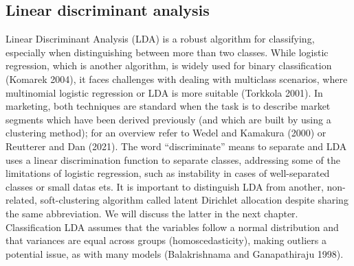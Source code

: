 \begin{Shaded}
\begin{Highlighting}[]
\OtherTok{\textless{}{-}} \SpecialCharTok{==} \NormalTok{) }\SpecialCharTok{\%\textgreater{}\%} \NormalTok{(}\SpecialCharTok{{-}}
\OtherTok{\textless{}{-}} \SpecialCharTok{==} \NormalTok{) }\SpecialCharTok{\%\textgreater{}\%} \NormalTok{(}\SpecialCharTok{{-}}

\end{Highlighting}
\end{Shaded}

\subsection{Linear discriminant
analysis}\label{linear-discriminant-analysis}

Linear Discriminant Analysis (LDA) is a robust algorithm for
classifying, especially when distinguishing between more than
two classes. While logistic regression, which is another algorithm, is
widely used for binary classification (Komarek 2004), it faces
challenges with dealing with multiclass scenarios, where multinomial logistic
regression or LDA is more suitable (Torkkola 2001). In marketing,
both techniques are standard when the task is to describe market segments which have been derived previously (and which are built by using a clustering method); for an overview refer to Wedel and Kamakura
(2000) or Reutterer and Dan (2021). The word ``discriminate'' means to
separate and LDA uses a linear discrimination function to separate
classes, addressing some of the limitations of logistic regression, such
as instability in cases of well-separated classes or small datas ets. It
is important to distinguish LDA from another, non-related,
soft-clustering algorithm called latent Dirichlet allocation despite
sharing the same abbreviation. We will discuss the latter in the next
chapter. Classification LDA assumes that the variables follow a normal
distribution and that variances are equal across groups
(homoscedasticity), making outliers a potential issue, as with many
models (Balakrishnama and Ganapathiraju 1998).

